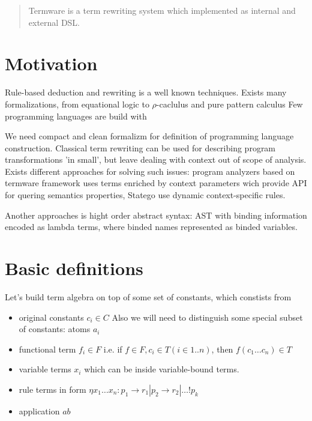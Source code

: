 \documentclass[12pt]{article}
\begin{document}
\maketitle

\begin{abstract}
 Termware is a term rewriting system which implemented as internal and external DSL.
\end{abstract}

\section{Motivation}

  Rule-based deduction and rewriting is a well known techniques. Exists many formalizations, from
  equational logic to $\rho$-caclulus \cite{RhoCal-Wrla2002} and pure pattern calculus\cite{Jay05purepattern}   Few programming languages are build
  with 


  We need compact and clean formalizm for definition of programming language construction. Classical term
 rewriting can be used for describing program transformations 'in small', but leave dealing with context out 
 of scope of analysis. Exists different approaches for solving such issues: program analyzers based on 
 termware framework \cite{DBLP:journals/fuin/DoroshenkoS06} uses terms enriched by context parameters wich provide
 API for quering semantics properties, Statego\cite{BravenboerKVV08} use dynamic context-specific rules.

 Another approaches is hight order abstract syntax\cite{Pfenning:1988:HAS:53990.54010}: AST with binding information encoded as lambda terms, where binded names represented as binded variables.  



\section{Basic definitions}

   Let's build term algebra on top of some set of constants, which constists from
\begin{itemize}
 \item original constants ${c_i} \in C$ Also we
 will need to distinguish some special subset of constants: atoms ${a_i}$
 \item functional term $f_i \in F$  i.e. if $f \in F, c_i \in T (i \in 1..n)$, then $f(c_{1} \dots c_{n}) \in T$
 \item variable terms $x_{i}$ which can be inside variable-bound terms.
 \item rule terms in form $\eta x_1 \dots x_n : p_{1} \to r_1 | p_2 \to r_2 | \dots ! p_{k}$
 \item application $a b$
\end{itemize}
\end{document}
